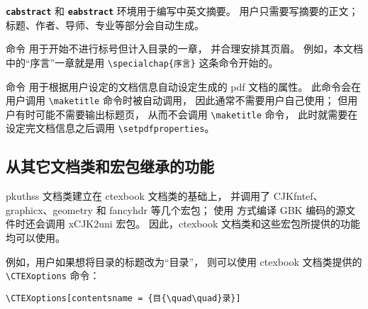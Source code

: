 		\texttt{\bfseries cabstract} 和 \texttt{\bfseries eabstract} %
		环境用于编写中英文摘要。
		用户只需要写摘要的正文；标题、作者、导师、专业等部分会自动生成。

		\texttt{\bfseries\string\specialchap} 命令%
		用于开始不进行标号但计入目录的一章，
		并合理安排其页眉。%
		例如，本文档中的“序言”一章就是用 \verb|\specialchap{序言}| %
		这条命令开始的。%

		\texttt{\bfseries\string\setpdfproperties} 命令%
		用于根据用户设定的文档信息自动设定生成的 pdf 文档的属性。
		此命令会在用户调用 \verb|\maketitle| 命令时被自动调用，
		因此通常不需要用户自己使用；
		但用户有时可能不需要输出标题页，
		从而不会调用 \verb|\maketitle| 命令，
		此时就需要在设定完文档信息之后调用 \verb|\setpdfproperties|。

		\subsection{从其它文档类和宏包继承的功能}\label{ssec:thirdparty}

		pkuthss 文档类建立在 ctexbook\supercite{ctex} 文档类的基础上，
		并调用了 CJKfntef、%
		graphicx\supercite{graphicx}、geometry\supercite{geometry} 和 %
		fancyhdr\supercite{fancyhdr} 等几个宏包；
		使用  方式编译 GBK 编码的源文件时还会调用
		xCJK2uni\supercite{xCJK2uni} 宏包。
		因此，ctexbook 文档类和这些宏包所提供的功能均可以使用。

		例如，用户如果想将目录的标题改为“目{\quad\quad}录”，
		则可以使用 ctexbook 文档类提供的 \verb|\CTEXoptions| 命令：
\begin{Verbatim}[frame = single]
\CTEXoptions[contentsname = {目{\quad\quad}录}]
\end{Verbatim}

